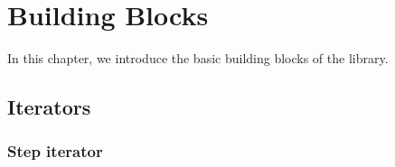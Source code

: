 %
%
%
%

\chapter{Building Blocks}
\label{chap:Building Blocks}

In this chapter, we introduce the basic building blocks of the library.

\section{Iterators}
\label{sec:Iterators}

\subsection{Step iterator}
\label{sub:Step iterator}

